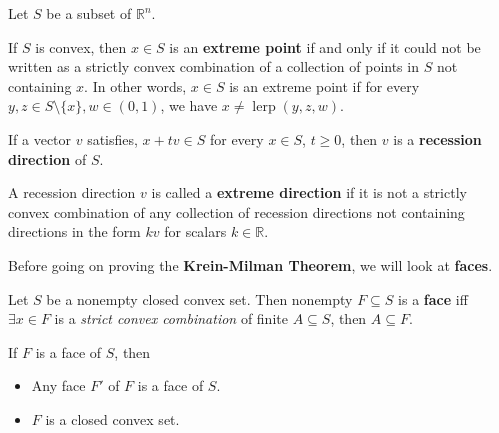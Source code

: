 \begin{definition}
  Let \( S \) be a subset of \( \mathbb{R}^{n} \).

  If \( S \) is convex, then \( x \in S \) is an \textbf{extreme point} if and only if
  it could not be written as a strictly convex combination of a collection
  of points in
  \( S \) not containing \( x \). In other words, \( x \in S \) is an extreme
  point if for every \( y, z \in S \setminus \{x\}, w \in (0, 1)   \), we have
  \( x \neq \operatorname{lerp}(y,z,w) \).

  If a vector \( v \) satisfies, \( x + tv \in S \) for every \( x \in S \), \(
  t \ge  0\), then \( v \) is a \textbf{recession direction} of \( S \).

  A recession direction \( v \) is called a \textbf{extreme direction} if it is
  not a strictly convex combination of any collection of recession directions
  not containing directions in the form \( kv \) for scalars \( k \in \mathbb{R}
  \).
\end{definition}

Before going on proving the  \textbf{Krein-Milman Theorem}, we will look at
\textbf{faces}.

\begin{definition}
  Let \( S \) be a nonempty closed convex set. Then nonempty \( F \subseteq S \)
  is a \textbf{face} iff
  \( \exists x \in F \) is a \textit{strict convex combination} of
  finite \( A \subseteq S \), then \( A \subseteq F \).
\end{definition}

\begin{theorem}
  If \( F \) is a face of \( S \), then
  \begin{itemize}
    \item Any face \( F' \) of \( F \) is a face of \( S \).
    \item \( F \) is a closed convex set.
  \end{itemize}
\end{theorem}

